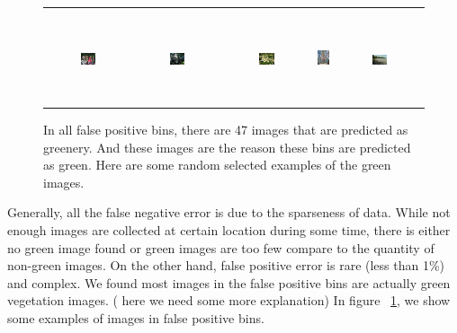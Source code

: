 \begin{figure}[th]
{{\begin{center}
\begin{tabular}{@{}c@{\,\,\,}c@{\,\,\,}c@{\,\,\,}c@{\,\,\,}c@{\,\,\,}}
\\[-6pt]
\hline
\\[-6pt]
\includegraphics[width=0.19\textwidth]{imggrid/falseposi/16.jpg} &
\includegraphics[width=0.19\textwidth]{imggrid/falseposi/17.jpg} &
\includegraphics[width=0.19\textwidth]{imggrid/falseposi/18.jpg} &
\includegraphics[height=1in]{imggrid/falseposi/19.jpg} &
\includegraphics[width=0.19\textwidth]{imggrid/falseposi/20.jpg} \\
\end{tabular}
\end{center}
}}
\caption{In all false positive bins, there are 47 images that are predicted as greenery. And these images are the reason these bins are predicted as green. Here are some random selected examples of the green images.}
\label{fig:falseposi}
\end{figure}
Generally, all the false negative error is due to the sparseness of data. While not enough images are collected at certain location during some time, there is either no green image found or green images are too few compare to the quantity of non-green images. On the other hand, false positive error is rare (less than 1\%) and complex. We found most images in the false positive bins are actually green vegetation images. ( here we need some more explanation) In figure ~\ref{fig:falseposi}, we show some examples of images in false positive bins.




